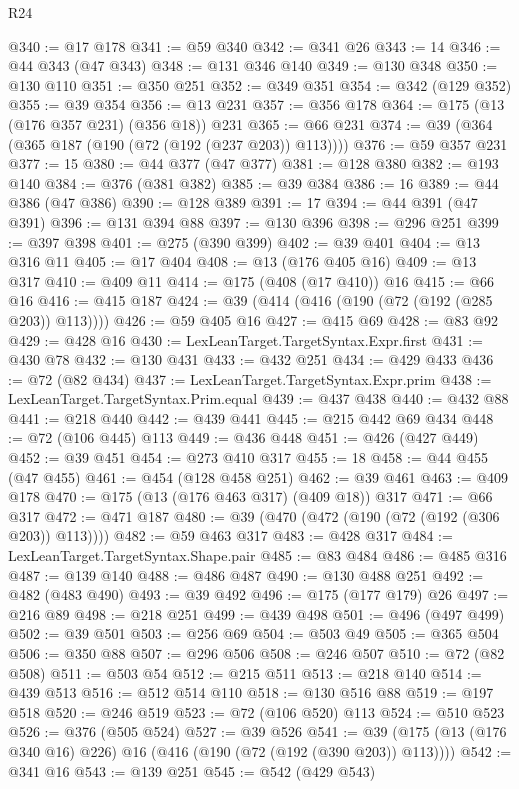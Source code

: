\begin{lexlean}{R24}
\begin{coremodule}
@340 := @17 @178
@341 := @59 @340
@342 := @341 @26
@343 := 14
@346 := @44 @343 (@47 @343)
@348 := @131 @346 @140
@349 := @130 @348
@350 := @130 @110
@351 := @350 @251
@352 := @349 @351
@354 := @342 (@129 @352)
@355 := @39 @354
@356 := @13 @231
@357 := @356 @178
@364 := @175 (@13 (@176 @357 @231) (@356 @18)) @231
@365 := @66 @231
@374 := @39 (@364 (@365 @187 (@190 (@72 (@192 (@237 @203)) @113))))
@376 := @59 @357 @231
@377 := 15
@380 := @44 @377 (@47 @377)
@381 := @128 @380
@382 := @193 @140
@384 := @376 (@381 @382)
@385 := @39 @384
@386 := 16
@389 := @44 @386 (@47 @386)
@390 := @128 @389
@391 := 17
@394 := @44 @391 (@47 @391)
@396 := @131 @394 @88
@397 := @130 @396
@398 := @296 @251
@399 := @397 @398
@401 := @275 (@390 @399)
@402 := @39 @401
@404 := @13 @316 @11
@405 := @17 @404
@408 := @13 (@176 @405 @16)
@409 := @13 @317
@410 := @409 @11
@414 := @175 (@408 (@17 @410)) @16
@415 := @66 @16
@416 := @415 @187
@424 := @39 (@414 (@416 (@190 (@72 (@192 (@285 @203)) @113))))
@426 := @59 @405 @16
@427 := @415 @69
@428 := @83 @92
@429 := @428 @16
@430 := LexLeanTarget.TargetSyntax.Expr.first
@431 := @430 @78
@432 := @130 @431
@433 := @432 @251
@434 := @429 @433
@436 := @72 (@82 @434)
@437 := LexLeanTarget.TargetSyntax.Expr.prim
@438 := LexLeanTarget.TargetSyntax.Prim.equal
@439 := @437 @438
@440 := @432 @88
@441 := @218 @440
@442 := @439 @441
@445 := @215 @442 @69 @434
@448 := @72 (@106 @445) @113
@449 := @436 @448
@451 := @426 (@427 @449)
@452 := @39 @451
@454 := @273 @410 @317
@455 := 18
@458 := @44 @455 (@47 @455)
@461 := @454 (@128 @458 @251)
@462 := @39 @461
@463 := @409 @178
@470 := @175 (@13 (@176 @463 @317) (@409 @18)) @317
@471 := @66 @317
@472 := @471 @187
@480 := @39 (@470 (@472 (@190 (@72 (@192 (@306 @203)) @113))))
@482 := @59 @463 @317
@483 := @428 @317
@484 := LexLeanTarget.TargetSyntax.Shape.pair
@485 := @83 @484
@486 := @485 @316
@487 := @139 @140
@488 := @486 @487
@490 := @130 @488 @251
@492 := @482 (@483 @490)
@493 := @39 @492
@496 := @175 (@177 @179) @26
@497 := @216 @89
@498 := @218 @251
@499 := @439 @498
@501 := @496 (@497 @499)
@502 := @39 @501
@503 := @256 @69
@504 := @503 @49
@505 := @365 @504
@506 := @350 @88
@507 := @296 @506
@508 := @246 @507
@510 := @72 (@82 @508)
@511 := @503 @54
@512 := @215 @511
@513 := @218 @140
@514 := @439 @513
@516 := @512 @514 @110
@518 := @130 @516 @88
@519 := @197 @518
@520 := @246 @519
@523 := @72 (@106 @520) @113
@524 := @510 @523
@526 := @376 (@505 @524)
@527 := @39 @526
@541 := @39 (@175 (@13 (@176 @340 @16) @226) @16 (@416 (@190 (@72 (@192 (@390 @203)) @113))))
@542 := @341 @16
@543 := @139 @251
@545 := @542 (@429 @543)

\end{coremodule}
\end{lexlean}
